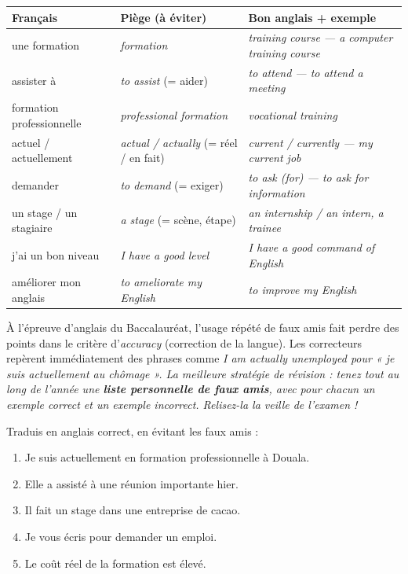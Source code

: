\documentclass[11pt]{article}
\newcommand{\eng}[1]{\ifmmode\text{\textit{#1}}\else\begingroup\selectlanguage{english}\itshape #1\endgroup\fi}
\begin{document}
\begin{center}
\begin{tabularx}{\linewidth}{|X|X|X|}
\hline
\rowcolor{popblueL} \textbf{Français} & \textbf{Piège (à éviter)} & \textbf{Bon anglais + exemple} \\
\hline
une formation & \emph{formation} & \eng{training course} — \eng{a computer training course} \\
\hline
assister à & \emph{to assist} (= aider) & \eng{to attend} — \eng{to attend a meeting} \\
\hline
formation professionnelle & \emph{professional formation} & \eng{vocational training} \\
\hline
actuel / actuellement & \emph{actual / actually} (= réel / en fait) & \eng{current / currently} — \eng{my current job} \\
\hline
demander & \emph{to demand} (= exiger) & \eng{to ask (for)} — \eng{to ask for information} \\
\hline
un stage / un stagiaire & \emph{a stage} (= scène, étape) & \eng{an internship / an intern, a trainee} \\
\hline
j'ai un bon niveau & \emph{I have a good level} & \eng{I have a good command of English} \\
\hline
améliorer mon anglais & \emph{to ameliorate my English} & \eng{to improve my English} \\
\hline
\end{tabularx}
\end{center}

\begin{savaistu}
À l'épreuve d'anglais du Baccalauréat, l'usage répété de faux amis fait perdre des points dans le critère d'\emph{accuracy} (correction de la langue). Les correcteurs repèrent immédiatement des phrases comme \eng{I am actually unemployed} pour « je suis actuellement au chômage ». La meilleure stratégie de révision : tenez tout au long de l'année une \textbf{liste personnelle de faux amis}, avec pour chacun un exemple correct et un exemple incorrect. Relisez-la la veille de l'examen !
\end{savaistu}

\begin{exercice}
Traduis en anglais correct, en évitant les faux amis :
\begin{enumerate}
\item Je suis actuellement en formation professionnelle à Douala.
\item Elle a assisté à une réunion importante hier.
\item Il fait un stage dans une entreprise de cacao.
\item Je vous écris pour demander un emploi.
\item Le coût réel de la formation est élevé.
\end{enumerate}
\end{exercice}
\end{document}
